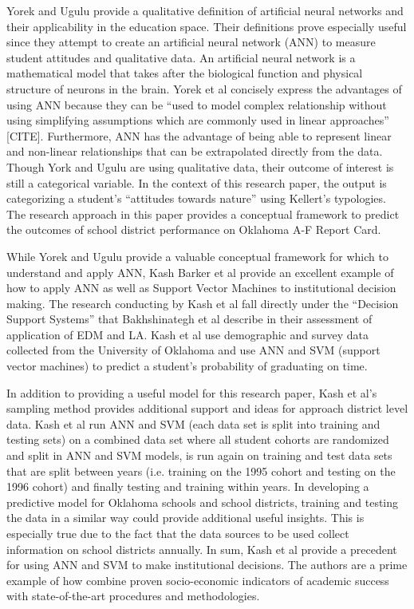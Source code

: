 \documentclass[]{article}
\begin{document}
Yorek and Ugulu provide a qualitative definition of artificial neural networks and their applicability in the education space. Their definitions prove especially useful since they attempt to create an artificial neural network (ANN) to measure student attitudes and qualitative data. An artificial neural network is a mathematical model that takes after the biological function and physical structure of neurons in the brain. Yorek et al concisely express the advantages of using ANN because they can be “used to model complex relationship without using simplifying assumptions which are commonly used in linear approaches” [CITE]. Furthermore, ANN has the advantage of being able to represent linear and non-linear relationships that can be extrapolated directly from the data. Though York and Ugulu are using qualitative data, their outcome of interest is still a categorical variable. In the context of this research paper, the output is categorizing a student’s “attitudes towards nature” using Kellert’s typologies. The research approach in this paper provides a conceptual framework to predict the outcomes of school district performance on Oklahoma A-F Report Card. 

While Yorek and Ugulu provide a valuable conceptual framework for which to understand and apply ANN, Kash Barker et al provide an excellent example of how to apply ANN as well as Support Vector Machines to institutional decision making. The research conducting by Kash et al fall directly under the “Decision Support Systems” that Bakhshinategh et al describe in their assessment of application of EDM and LA. Kash et al use demographic and survey data collected from the University of Oklahoma and use ANN and SVM (support vector machines) to predict a student’s probability of graduating on time. 

In addition to providing a useful model for this research paper, Kash et al’s sampling method provides additional support and ideas for approach district level data. Kash et al run ANN and SVM (each data set is split into training and testing sets) on a combined data set where all student cohorts are randomized and split in ANN and SVM models, is run again on training and test data sets that are split between years (i.e. training on the 1995 cohort and testing on the 1996 cohort) and finally testing and training within years. In developing a predictive model for Oklahoma schools and school districts, training and testing the data in a similar way could provide additional useful insights. This is especially true due to the fact that the data sources to be used collect information on school districts annually. In sum, Kash et al provide a precedent for using ANN and SVM to make institutional decisions. The authors are a prime example of how combine proven socio-economic indicators of academic success with state-of-the-art procedures and methodologies.   
\end{document}
